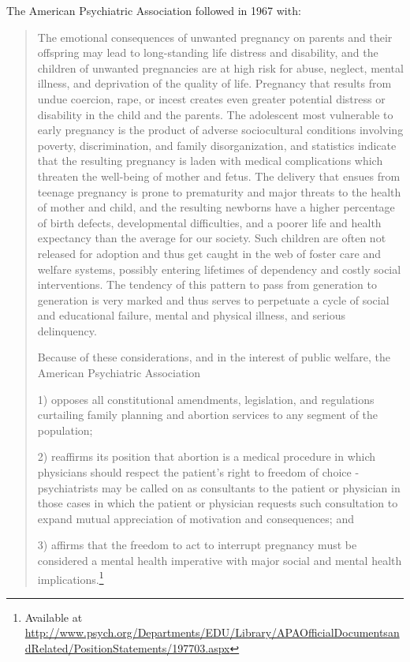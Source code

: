 \begin{refsection}
The American Psychiatric Association followed in 1967 with:

\begin{quote}

The emotional consequences of unwanted pregnancy on parents and their offspring may lead to long-standing life distress and disability, and the children of unwanted pregnancies are at high risk for abuse, neglect, mental illness, and deprivation of the quality of life. Pregnancy that results from undue coercion, rape, or incest creates even greater potential distress or disability in the child and the parents. The adolescent most vulnerable to early pregnancy is the product of adverse sociocultural conditions involving poverty, discrimination, and family disorganization, and statistics indicate that the resulting pregnancy is laden with medical complications which threaten the well-being of mother and fetus. The delivery that ensues from teenage pregnancy is prone to prematurity and major threats to the health of mother and child, and the resulting newborns have a higher percentage of birth defects, developmental difficulties, and a poorer life and health expectancy than the average for our society. Such children are often not released for adoption and thus get caught in the web of foster care and welfare systems, possibly entering lifetimes of dependency and costly social interventions. The tendency of this pattern to pass from generation to generation is very marked and thus serves to perpetuate a cycle of social and educational failure, mental and physical illness, and serious delinquency.

Because of these considerations, and in the interest of public welfare, the American Psychiatric Association

1) opposes all constitutional amendments, legislation, and regulations curtailing family planning and abortion services to any segment of the population; 

2) reaffirms its position that abortion is a medical procedure in which physicians should respect the patient's right to freedom of choice - psychiatrists may be called on as consultants to the patient or physician in those cases in which the patient or physician requests such consultation to expand mutual appreciation of motivation and consequences; and 

3) affirms that the freedom to act to interrupt pregnancy must be considered a mental health imperative with major social and mental health implications.\footnote{Available at \url{http://www.psych.org/Departments/EDU/Library/APAOfficialDocumentsandRelated/PositionStatements/197703.aspx}} ~\citep{Anonymous:1967hr}
\end{quote}


\end{refsection}

